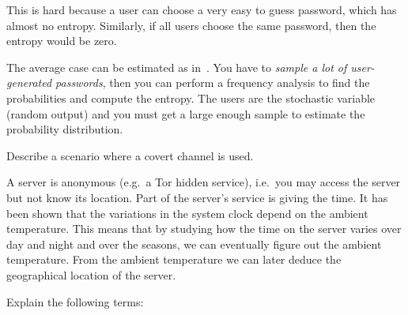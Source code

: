 \documentclass[svv,addpoints]{miunexam}
\begin{document}
\begin{questions}
\begin{solution}
    This is hard because a user can choose a very easy to guess password, which 
    has almost no entropy.
    Similarly, if all users choose the same password, then the entropy would be 
    zero.

    The average case can be estimated as in~\cite{Komanduri2011opa}.
    You have to \emph{sample a lot of user-generated passwords}, then you can 
    perform a frequency analysis to find the probabilities and compute the 
    entropy.
    The users are the stochastic variable (random output) and you must get 
    a large enough sample to estimate the probability distribution.
  \end{solution}


  
\question[4]\label{q:sidechannels}
Describe a scenario where a covert channel is used.

\begin{solution}
  A server is anonymous (e.g.\ a Tor hidden service), i.e.\ you may access the 
  server but not know its location.
  Part of the server's service is giving the time.
  It has been shown that the variations in the system clock depend on the 
  ambient temperature.
  This means that by studying how the time on the server varies over day and 
  night and over the seasons, we can eventually figure out the ambient 
  temperature.
  From the ambient temperature we can later deduce the geographical location of 
  the server.
\end{solution}



\question\label{q:passwd:auth:E}
  Explain the following terms:


 
\end{questions}


\printbibliography{}
\end{document}
